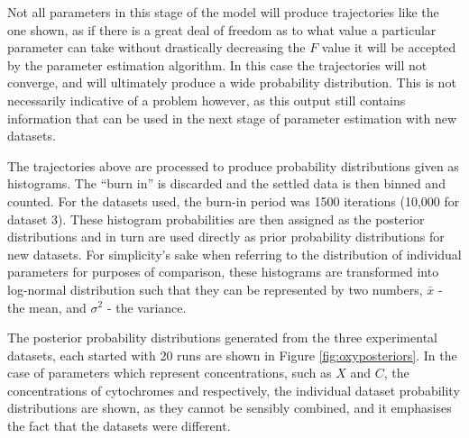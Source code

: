 Not all parameters in this stage of the model will produce trajectories like the one shown, as if there is a great deal of freedom as to what value a particular parameter can take without drastically decreasing the $F$ value it will be accepted by the parameter estimation algorithm. In this case the trajectories will not converge, and will ultimately produce a wide probability distribution. This is not necessarily indicative of a problem however, as this output still contains information that can be used in the next stage of parameter estimation with new datasets.

The trajectories above are processed to produce probability distributions given as histograms. The ``burn in'' is discarded and the settled data is then binned and counted. For the datasets used, the burn-in period was 1500 iterations (10,000 for dataset 3). These histogram probabilities are then assigned as the posterior distributions and in turn are used directly as prior probability distributions for new datasets. For simplicity's sake when referring to the distribution of individual parameters for purposes of comparison, these histograms are transformed into log-normal distribution such that they can be represented by two numbers, $\bar{x}$ - the mean, and $\sigma^2$ - the variance.

The posterior probability distributions generated from the three experimental datasets, each started with 20 runs are shown in Figure \ref{fig:oxyposteriors}. In the case of parameters which represent concentrations, such as $X$ and $C$, the concentrations of cytochromes and \cbbthree{} respectively, the individual dataset probability distributions are shown, as they cannot be sensibly combined, and it emphasises the fact that the datasets were different.

